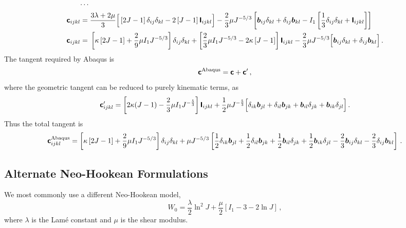 \documentclass[10pt,letterpaper,oneside]{report}
\newcommand{\ten}[1]{\mbox{\boldmath $#1$}{}}
\newcommand{\tenf}[1]{\mbox{{\sffamily{\bfseries {#1}}}}}
\newcommand{\scas}[1]{\mbox{{\scriptsize{${\rm{#1}}$}}}{}}
\begin{document}
\begin{align}
\cdots{}& \notag \\
\tenf{c}_{ijkl} ={}& \frac{3 \lambda + 2 \mu}{3} \Big[ \left[ 2J - 1 \right] \delta_{ij} \delta_{kl} - 2 \left[ J - 1 \right] \tenf{I}_{ijkl} \Big] - \frac{2}{3} \mu J^{-5/3} \left[ \ten{b}_{ij} \delta_{kl} + \delta_{ij} \ten{b}_{kl} - I_1 \left[ \frac{1}{3} \delta_{ij} \delta_{kl} + \tenf{I}_{ijkl} \right] \right]  
\\
\tenf{c}_{ijkl} ={}& \left[ \kappa \left[ 2J - 1 \right] + \frac{2}{9} \mu I_1 J^{-5/3} \right] \delta_{ij} \delta_{kl} + \left[ \frac{2}{3} \mu I_1 J^{-5/3}  - 2 \kappa \left[ J - 1 \right] \right] \tenf{I}_{ijkl} - \frac{2}{3} \mu J^{-5/3} \Big[ \ten{b}_{ij} \delta_{kl} + \delta_{ij} \ten{b}_{kl} \Big] \, . 
\end{align}
The tangent required by Abaqus is
\begin{equation}
\tenf{c}^{\scas{Abaqus}} = \tenf{c} + \tenf{c}' \, , 
\end{equation}
where the geometric tangent can be reduced to purely kinematic terms, as 
\begin{equation}
\tenf{c}'_{ijkl} = \left[ 2 \kappa (J-1) - \frac{2}{3} \mu I_1 J^{- \frac{5}{3} } \right] \tenf{I}_{ijkl} + \frac{1}{2}\mu J^{- \frac{5}{3} } \Big[ \delta_{ik} \ten{b}_{jl} + \delta_{il} \ten{b}_{jk} + \ten{b}_{il} \delta_{jk} + \ten{b}_{ik} \delta_{jl} \Big] \, . 
\end{equation}
Thus the total tangent is
\begin{equation}
\tenf{c}^{\scas{Abaqus}}_{ijkl} = \left[ \kappa \left[ 2J - 1 \right] + \frac{2}{9} \mu I_1 J^{-5/3} \right] \delta_{ij} \delta_{kl} +\mu J^{-5/3} \left[ \frac{1}{2} \delta_{ik} \ten{b}_{jl} + \frac{1}{2} \delta_{il} \ten{b}_{jk} + \frac{1}{2} \ten{b}_{il} \delta_{jk} + \frac{1}{2} \ten{b}_{ik} \delta_{jl} - \frac{2}{3} \ten{b}_{ij} \delta_{kl} - \frac{2}{3} \delta_{ij} \ten{b}_{kl} \right] \, . 
\end{equation}


\subsection{Alternate Neo-Hookean Formulations}
We most commonly use a different Neo-Hookean model, 
\begin{equation}
W_0 = \frac{\lambda}{2} \ln^2 J + \frac{\mu}{2} \left[ I_1 - 3 - 2 \ln J \right] \, ,
\end{equation}
where $\lambda$ is the Lamé constant and $\mu$ is the shear modulus.
\end{document}
